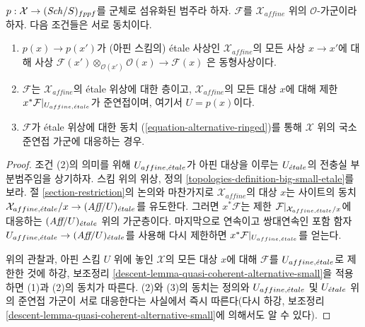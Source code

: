 \begin{lemma}
\label{lemma-locally-quasi-coherent-alternative}
$p : \mathcal{X} \to (\mathit{Sch}/S)_{fppf}$를 군체로 섬유화된 범주라 하자.
$\mathcal{F}$를 $\mathcal{X}_{affine}$ 위의 $\mathcal{O}$-가군이라 하자.
다음 조건들은 서로 동치이다.
\begin{enumerate}
\item $p(x) \to p(x')$가 (아핀 스킴의) \'etale 사상인
$\mathcal{X}_{affine}$의 모든 사상 $x \to x'$에 대해 사상
$\mathcal{F}(x') \otimes_{\mathcal{O}(x')} \mathcal{O}(x) \to \mathcal{F}(x)$
은 동형사상이다.
\item $\mathcal{F}$는 $\mathcal{X}_{affine}$의 \'etale 위상에 대한 층이고,
$\mathcal{X}_{affine}$의 모든 대상 $x$에 대해 제한
$x^*\mathcal{F}|_{U_{affine, {\acute{e}tale}}}$가 준연접이며, 여기서 $U = p(x)$이다.
\item $\mathcal{F}$가 \'etale 위상에 대한 동치
(\ref{equation-alternative-ringed})를 통해 $\mathcal{X}$ 위의 국소
준연접 가군에 대응하는 경우.
\end{enumerate}
\end{lemma}

\begin{proof}
조건 (2)의 의미를 위해 $U_{affine, {\acute{e}tale}}$가 아핀 대상을 이루는
$U_{\acute{e}tale}$의 전충실 부분범주임을 상기하자. 스킴 위의 위상, 정의
\ref{topologies-definition-big-small-etale}를 보라. 절
\ref{section-restriction}의 논의와 마찬가지로 $\mathcal{X}_{affine}$의
대상 $x$는 사이트의 동치
$\mathcal{X}_{affine, {\acute{e}tale}}/x \to (\textit{Aff}/U)_{\acute{e}tale}$를 유도한다.
그러면 $x^*\mathcal{F}$는 제한
$\mathcal{F}|_{\mathcal{X}_{affine, {\acute{e}tale}}/x}$에 대응하는
$(\textit{Aff}/U)_{\acute{e}tale}$ 위의 가군층이다. 마지막으로 연속이고
쌍대연속인 포함 함자 $U_{affine, {\acute{e}tale}} \to (\textit{Aff}/U)_{\acute{e}tale}$를
사용해 다시 제한하면 $x^*\mathcal{F}|_{U_{affine, {\acute{e}tale}}}$를 얻는다.

\medskip\noindent
위의 관찰과, 아핀 스킴 $U$ 위에 놓인 $\mathcal{X}$의 모든 대상 $x$에
대해 $\mathcal{F}$를 $U_{affine, {\acute{e}tale}}$로 제한한 것에 하강,
보조정리 \ref{descent-lemma-quasi-coherent-alternative-small}을 적용하면
(1)과 (2)의 동치가 따른다. (2)와 (3)의 동치는 정의와
$U_{affine, {\acute{e}tale}}$ 및 $U_{\acute{e}tale}$ 위의 준연접 가군이 서로 대응한다는
사실에서 즉시 따른다(다시
하강, 보조정리 \ref{descent-lemma-quasi-coherent-alternative-small}에
의해서도 알 수 있다).
\end{proof}













